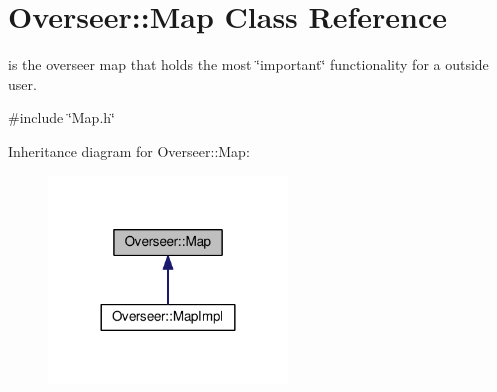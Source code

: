 \hypertarget{classOverseer_1_1Map}{}\section{Overseer\+:\+:Map Class Reference}
\label{classOverseer_1_1Map}


is the overseer map that holds the most \char`\"{}important\char`\"{} functionality for a outside user.  




{\ttfamily \#include \char`\"{}Map.\+h\char`\"{}}



Inheritance diagram for Overseer\+:\+:Map\+:\nopagebreak
\begin{figure}[H]
\begin{center}
\leavevmode
\includegraphics[width=180pt]{classOverseer_1_1Map__inherit__graph}
\end{center}
\end{figure}
